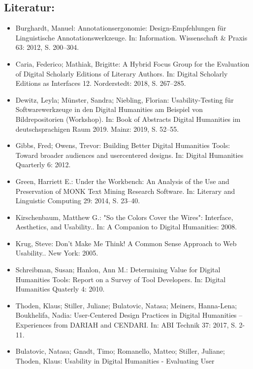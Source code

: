 \documentclass{article}
\begin{document}
        \subsection*{Literatur:}\begin{itemize}\item Burghardt, Manuel: Annotationsergonomie: Design-Empfehlungen für
                              Linguistische Annotationswerkzeuge. In: Information. Wissenschaft & Praxis 63: 2012, S. 200–304.\item Caria, Federico; Mathiak, Brigitte: A Hybrid Focus Group for the Evaluation of Digital
                              Scholarly Editions of Literary Authors. In: Digital Scholarly Editions as Interfaces 12. Norderstedt: 2018, S. 267–285.\item Dewitz, Leyla; Münster, Sandra; Niebling, Florian: Usability-Testing für Softwarewerkzeuge in den Digital
                              Humanities am Beispiel von Bildrepositorien (Workshop). In: Book of Abstracts Digital Humanities im deutschsprachigen Raum
                              2019. Mainz: 2019, S. 52–55.\item Gibbs, Fred; Owens, Trevor: Building Better Digital Humanities Tools: Toward broader
                              audiences and user­centered designs. In: Digital Humanities Quarterly 6: 2012.\item Green, Harriett E.: Under the Workbench: An Analysis of the Use and
                              Preservation of MONK Text Mining Research Software. In: Literary and Linguistic Computing 29: 2014, S. 23–40.\item Kirschenbaum, Matthew G.: "So the Colors Cover the Wires": Interface, Aesthetics,
                              and Usability.. In: A Companion to Digital Humanities: 2008.\item Krug, Steve: Don't Make Me Think! A Common Sense Approach to Web
                              Usability.. New York: 2005.\item Schreibman, Susan; Hanlon, Ann M.: Determining Value for Digital Humanities Tools: Report
                              on a Survey of Tool Developers. In: Digital Humanities Quaterly 4: 2010.\item Thoden, Klaus; Stiller, Juliane; Bulatovic, Natasa; Meiners, Hanna-Lena; Boukhelifa, Nadia: User-Centered Design Practices in Digital Humanities –
                              Experiences from DARIAH and CENDARI. In: ABI Technik 37: 2017, S. 2-11.\item Bulatovic, Natasa; Gnadt, Timo; Romanello, Matteo; Stiller, Juliane; Thoden, Klaus: Usability in Digital Humanities - Evaluating User

\end{itemize}
\end{document}
